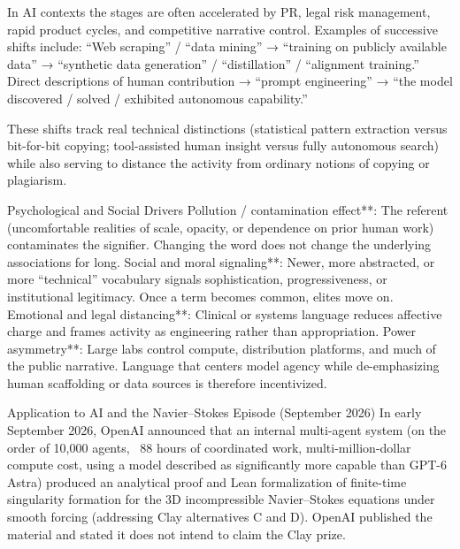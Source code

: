 In AI contexts the stages are often accelerated by PR, legal risk management, rapid product cycles, and competitive narrative control. Examples of successive shifts include:
“Web scraping” / “data mining” → “training on publicly available data” → “synthetic data generation” / “distillation” / “alignment training.”
Direct descriptions of human contribution → “prompt engineering” → “the model discovered / solved / exhibited autonomous capability.”

These shifts track real technical distinctions (statistical pattern extraction versus bit-for-bit copying; tool-assisted human insight versus fully autonomous search) while also serving to distance the activity from ordinary notions of copying or plagiarism.

Psychological and Social Drivers
Pollution / contamination effect**: The referent (uncomfortable realities of scale, opacity, or dependence on prior human work) contaminates the signifier. Changing the word does not change the underlying associations for long.
Social and moral signaling**: Newer, more abstracted, or more “technical” vocabulary signals sophistication, progressiveness, or institutional legitimacy. Once a term becomes common, elites move on.
Emotional and legal distancing**: Clinical or systems language reduces affective charge and frames activity as engineering rather than appropriation.
Power asymmetry**: Large labs control compute, distribution platforms, and much of the public narrative. Language that centers model agency while de-emphasizing human scaffolding or data sources is therefore incentivized.

Application to AI and the Navier–Stokes Episode (September 2026)
In early September 2026, OpenAI announced that an internal multi-agent system (on the order of 10,000 agents, ~88 hours of coordinated work, multi-million-dollar compute cost, using a model described as significantly more capable than GPT-6 Astra) produced an analytical proof and Lean formalization of finite-time singularity formation for the 3D incompressible Navier–Stokes equations under smooth forcing (addressing Clay alternatives C and D). OpenAI published the material and stated it does not intend to claim the Clay prize.

